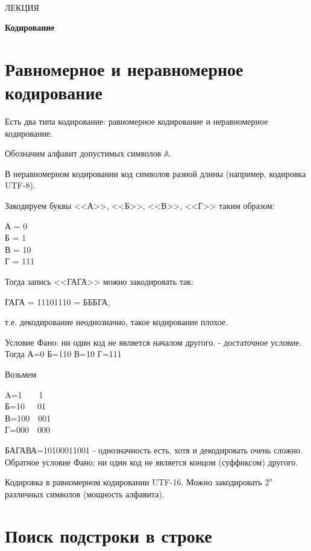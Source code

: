 \documentclass[a4paper,12pt]{article}
\theoremstyle{plain} %
\theoremstyle{definition} %
\theoremstyle{remark} %
\begin{document}
\newcommand{\lec}[1]{\addtocounter{lec}{1} \setcounter{section}{0}%
\begin{center}
{\LARGE ЛЕКЦИЯ %
\vspace{2mm}%

\textbf{#1}%
}
\end{center}
}
\newpage
\
\setcounter{lec}{23}
\lec{Кодирование}
\section{Равномерное и неравномерное кодирование}
Есть два типа кодирование: равномерное кодирование и неравномерное кодирование.

Обозначим алфавит допустимых символов $\mathbb{A}$.

В неравномерном кодировании код символов разной длины (например, кодировка UTF-8).

Закодируем буквы <<А>>, <<Б>>, <<В>>, <<Г>> таким образом:
\begin{center}
А = 0\\
Б = 1\\
В = 10\\
Г = 111\\
\end{center}
Тогда запись <<ГАГА>> можно закодировать так:
\begin{center}
ГАГА = 11101110 = БББГА,
\end{center}
т.е. декодирование неоднозначно, такое кодирование плохое.

Условие Фано: ни один код не является началом  другого. - достаточное условие.
Тогда
А=0
Б=110
В=10
Г=111

Возьмем
\begin{center}
A=1\ \ \ \ 1\\
Б=10\ \ \ 01\\
В=100\ \ 001\\
Г=000\ \ 000\\
\end{center}
БАГАВА=10100011001 - однозначность есть, хотя и декодировать очень сложно.
Обратное условие Фано: ни один код не является концом (суффиксом) другого.
 

Кодировка в равномерном кодировании UTF-16. Можно закодировать $2^n$ различных символов (мощность алфавита).

\section{Поиск подстроки в строке}
\end{document}
